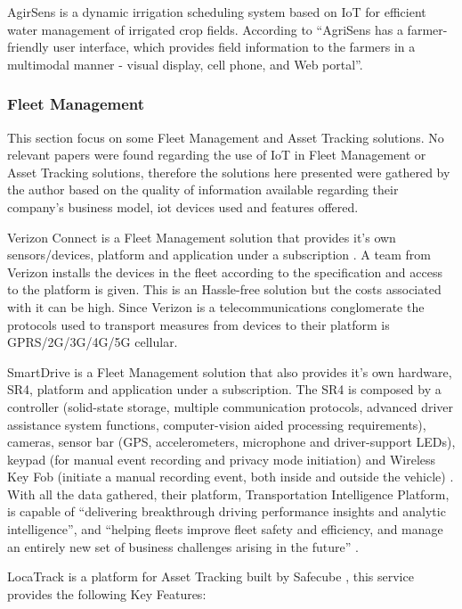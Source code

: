 AgirSens is a dynamic irrigation scheduling system based on IoT for efficient water management of irrigated crop fields. According to \cite{9249427} ``AgriSens has a farmer-friendly user interface, which provides field information to the farmers in a multimodal manner - visual display, cell phone, and Web portal''.

\subsubsection{Fleet Management}
\label{subsubsec:stateofart:arch:solutions:fleet}

This section focus on some Fleet Management and Asset Tracking solutions. No relevant papers were found regarding the use of \gls{IoT} in Fleet Management or Asset Tracking solutions, therefore the solutions here presented were gathered by the author based on the quality of information available regarding their company's business model, iot devices used and features offered.

Verizon Connect is a Fleet Management solution that provides it's own sensors/devices, platform and application under a subscription \parencite{verizon-iot}.
A team from Verizon installs the devices in the fleet according to the specification and access to the platform is given. This is an Hassle-free solution but the costs associated with it can be high. Since Verizon is a telecommunications conglomerate the protocols used to transport measures from devices to their platform is GPRS/2G/3G/4G/5G cellular.

SmartDrive is a Fleet Management solution that also provides it's own hardware, SR4, platform and application under a subscription. The SR4 is composed by a controller (solid-state storage, multiple communication protocols, advanced driver assistance system functions, computer-vision aided processing requirements), cameras, sensor bar (GPS, accelerometers, microphone and driver-support LEDs), keypad (for manual event recording and privacy mode initiation) and Wireless Key Fob (initiate a manual recording event, both inside and outside the vehicle) \parencite{smartdrive-iot}. With all the data gathered, their platform, Transportation Intelligence Platform, is capable of ``delivering breakthrough driving performance insights and analytic intelligence'', and ``helping fleets improve fleet safety and efficiency, and manage an entirely new set of business challenges arising in the future'' \parencite{smartdrive-iot2}.

LocaTrack is a platform for Asset Tracking built by Safecube \parencite{safecube}, this service provides the following Key Features: 

